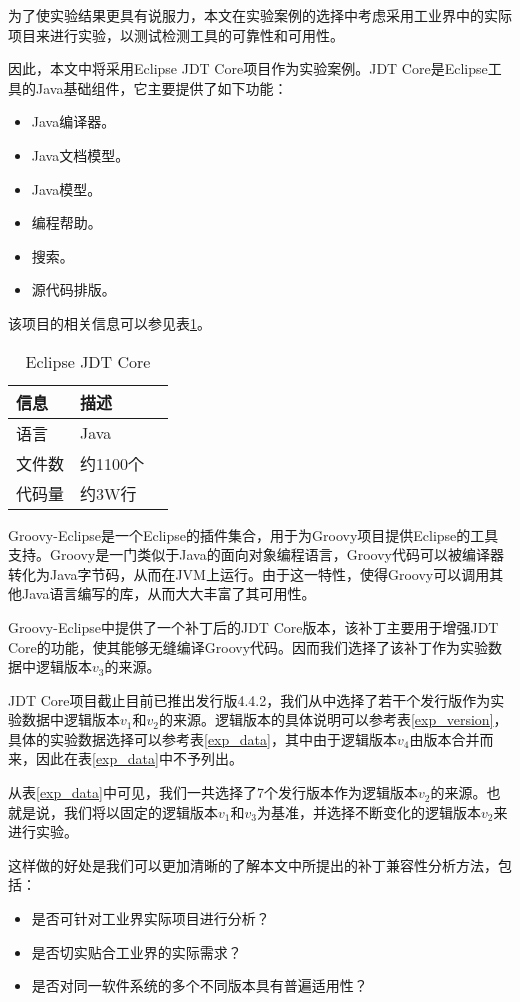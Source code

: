 为了使实验结果更具有说服力，本文在实验案例的选择中考虑采用工业界中的实际项目来进行实验，以测试检测工具的可靠性和可用性。

因此，本文中将采用Eclipse JDT Core项目作为实验案例。JDT Core是Eclipse工具的Java基础组件，它主要提供了如下功能：
\begin{itemize}
	\item Java编译器。
	\item Java文档模型。
	\item Java模型。
	\item 编程帮助。
	\item 搜索。
	\item 源代码排版。
\end{itemize}

该项目的相关信息可以参见表\ref {jdt_core}。

\begin{table}[H]
	\caption{Eclipse JDT Core}
	\label{jdt_core}
	\centering
	\begin{tabular}{llc}
		\toprule[1.5pt]
		{\heiti 信息} & {\heiti 描述} \\\midrule[1pt]
		语言 & Java \\
		文件数 & 约1100个\\
		代码量 & 约3W行\\
		\bottomrule[1.5pt]
	\end{tabular}
\end{table}

Groovy-Eclipse是一个Eclipse的插件集合，用于为Groovy项目提供Eclipse的工具支持。Groovy是一门类似于Java的面向对象编程语言，Groovy代码可以被编译器转化为Java字节码，从而在JVM上运行。由于这一特性，使得Groovy可以调用其他Java语言编写的库，从而大大丰富了其可用性。

Groovy-Eclipse中提供了一个补丁后的JDT Core版本，该补丁主要用于增强JDT Core的功能，使其能够无缝编译Groovy代码。因而我们选择了该补丁作为实验数据中逻辑版本$v_3$的来源。

JDT Core项目截止目前已推出发行版4.4.2，我们从中选择了若干个发行版作为实验数据中逻辑版本$v_1$和$v_2$的来源。逻辑版本的具体说明可以参考表\ref {exp_version}，具体的实验数据选择可以参考表\ref {exp_data}，其中由于逻辑版本$v_4$由版本合并而来，因此在表\ref {exp_data}中不予列出。

从表\ref {exp_data}中可见，我们一共选择了7个发行版本作为逻辑版本$v_2$的来源。也就是说，我们将以固定的逻辑版本$v_1$和$v_3$为基准，并选择不断变化的逻辑版本$v_2$来进行实验。

这样做的好处是我们可以更加清晰的了解本文中所提出的补丁兼容性分析方法，包括：
\begin{itemize}
	\item 是否可针对工业界实际项目进行分析？
	\item 是否切实贴合工业界的实际需求？
	\item 是否对同一软件系统的多个不同版本具有普遍适用性？
\end{itemize}

